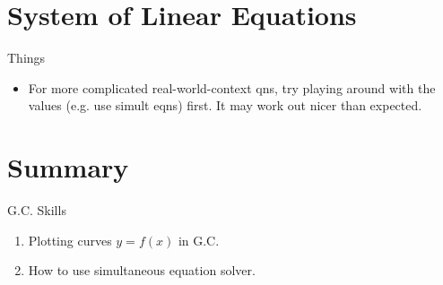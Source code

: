 \documentclass[oneside]{book}
\begin{document}
\section{System of Linear Equations}
\begin{stbox}{Things}
  \begin{itemize}[label=\(\chi\)]
    \item  For more complicated real-world-context qns, try playing around with the values (e.g. use simult eqns) first. It may work out nicer than expected.
  \end{itemize}
\end{stbox}
\section{Summary}

\begin{lbox}[colbacktitle=white, coltitle=black, colframe=black]{G.C. Skills} 
  \begin{enumerate}
    \item Plotting curves \(y=f(x)\) in G.C.
    \item How to use simultaneous equation solver.
  \end{enumerate}
\end{lbox}
\end{document}
